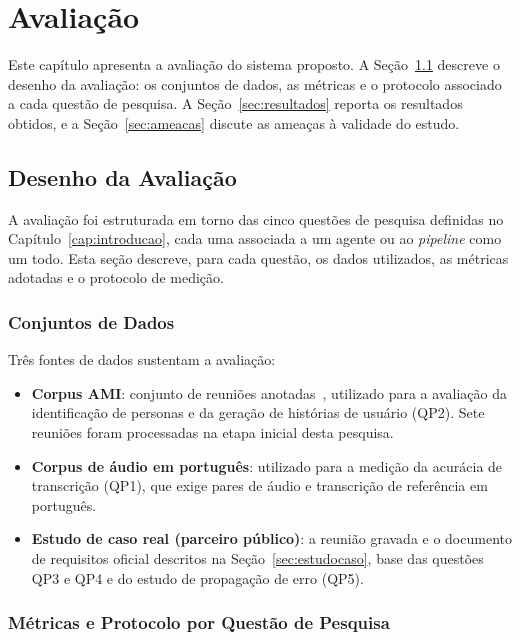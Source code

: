 
\chapter{Avaliação}
\label{cap:avaliacao}

Este capítulo apresenta a avaliação do sistema proposto. A Seção~\ref{sec:desenho} descreve o desenho da avaliação: os conjuntos de dados, as métricas e o protocolo associado a cada questão de pesquisa. A Seção~\ref{sec:resultados} reporta os resultados obtidos, e a Seção~\ref{sec:ameacas} discute as ameaças à validade do estudo.

\section{Desenho da Avaliação}
\label{sec:desenho}

A avaliação foi estruturada em torno das cinco questões de pesquisa definidas no Capítulo~\ref{cap:introducao}, cada uma associada a um agente ou ao \textit{pipeline} como um todo. Esta seção descreve, para cada questão, os dados utilizados, as métricas adotadas e o protocolo de medição.

\subsection{Conjuntos de Dados}

Três fontes de dados sustentam a avaliação:

\begin{itemize}
    \item \textbf{Corpus AMI}: conjunto de reuniões anotadas~\cite{ami_dataset}, utilizado para a avaliação da identificação de personas e da geração de histórias de usuário (QP2). Sete reuniões foram processadas na etapa inicial desta pesquisa.
    \item \textbf{Corpus de áudio em português}: utilizado para a medição da acurácia de transcrição (QP1), que exige pares de áudio e transcrição de referência em português.
    \item \textbf{Estudo de caso real (parceiro público)}: a reunião gravada e o documento de requisitos oficial descritos na Seção~\ref{sec:estudocaso}, base das questões QP3 e QP4 e do estudo de propagação de erro (QP5).
\end{itemize}

\subsection{Métricas e Protocolo por Questão de Pesquisa}

